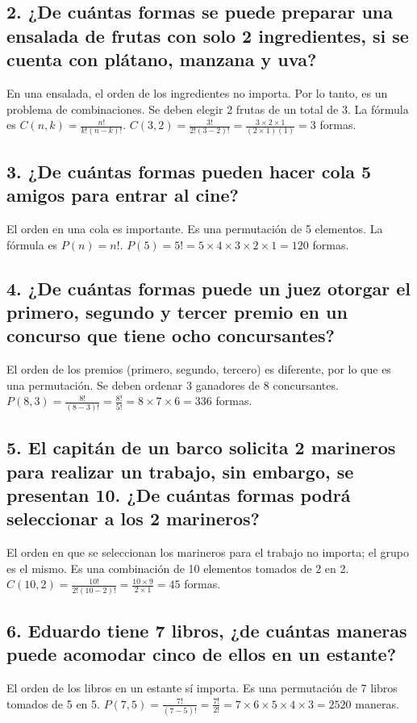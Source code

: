 \documentclass[11pt]{article}
\begin{document}
    \subsection*{2. ¿De cuántas formas se puede preparar una ensalada de frutas con solo 2 ingredientes, si se cuenta con plátano, manzana y uva?}
    En una ensalada, el orden de los ingredientes no importa. Por lo tanto, es un problema de combinaciones. Se deben elegir 2 frutas de un total de 3.
    La fórmula es $C(n,k) = \frac{n!}{k!(n-k)!}$.
    $C(3,2) = \frac{3!}{2!(3-2)!} = \frac{3 \times 2 \times 1}{(2 \times 1)(1)} = 3$ formas.

    \subsection*{3. ¿De cuántas formas pueden hacer cola 5 amigos para entrar al cine?}
    El orden en una cola es importante. Es una permutación de 5 elementos.
    La fórmula es $P(n) = n!$.
    $P(5) = 5! = 5 \times 4 \times 3 \times 2 \times 1 = 120$ formas.

    \subsection*{4. ¿De cuántas formas puede un juez otorgar el primero, segundo y tercer premio en un concurso que tiene ocho concursantes?}
    El orden de los premios (primero, segundo, tercero) es diferente, por lo que es una permutación. Se deben ordenar 3 ganadores de 8 concursantes.
    $P(8,3) = \frac{8!}{(8-3)!} = \frac{8!}{5!} = 8 \times 7 \times 6 = 336$ formas.

    \subsection*{5. El capitán de un barco solicita 2 marineros para realizar un trabajo, sin embargo, se presentan 10. ¿De cuántas formas podrá seleccionar a los 2 marineros?}
    El orden en que se seleccionan los marineros para el trabajo no importa; el grupo es el mismo. Es una combinación de 10 elementos tomados de 2 en 2.
    $C(10,2) = \frac{10!}{2!(10-2)!} = \frac{10 \times 9}{2 \times 1} = 45$ formas.

    \subsection*{6. Eduardo tiene 7 libros, ¿de cuántas maneras puede acomodar cinco de ellos en un estante?}
    El orden de los libros en un estante sí importa. Es una permutación de 7 libros tomados de 5 en 5.
    $P(7,5) = \frac{7!}{(7-5)!} = \frac{7!}{2!} = 7 \times 6 \times 5 \times 4 \times 3 = 2520$ maneras.
\end{document}
